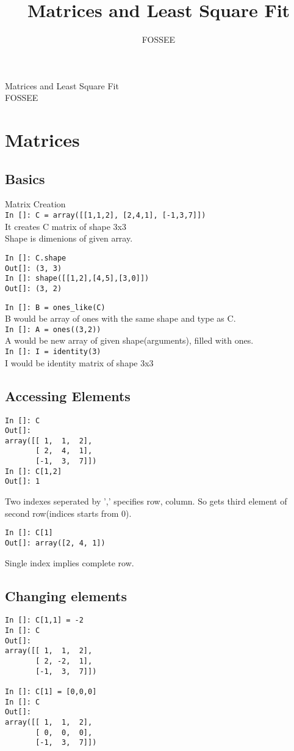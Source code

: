 \documentclass[12pt]{article}
\title{Matrices and Least Square Fit}
\author{FOSSEE}
\newcommand{\typ}[1]{\lstinline{#1}}
\begin{document}
\date{}
\vspace{-1in}
\begin{center}
\LARGE{Matrices and Least Square Fit}\\
\large{FOSSEE}
\end{center}
\section{Matrices}
\subsection{Basics}
Matrix Creation\\
\typ{In []: C = array([[1,1,2], [2,4,1], [-1,3,7]])}\\
It creates C matrix of shape 3x3\\
Shape is dimenions of given array.
\begin{lstlisting}
In []: C.shape 
Out[]: (3, 3)
In []: shape([[1,2],[4,5],[3,0]])
Out[]: (3, 2)
\end{lstlisting}
\typ{In []: B = ones_like(C)} \\
B would be array of ones with the same shape and type as C.\\
\typ{In []: A = ones((3,2))} \\
A would be new array of given shape(arguments), filled with ones.\\ 
\typ{In []: I = identity(3)}\\
I would be identity matrix of shape 3x3

\subsection{Accessing Elements}
\begin{lstlisting}
In []: C
Out[]: 
array([[ 1,  1,  2],
       [ 2,  4,  1],
       [-1,  3,  7]])
In []: C[1,2]
Out[]: 1
\end{lstlisting}
Two indexes seperated by ',' specifies row, column. So  gets third element of second row(indices starts from 0).
\newpage
\begin{lstlisting}
In []: C[1]
Out[]: array([2, 4, 1])
\end{lstlisting}
Single index implies complete row.
\subsection{Changing elements}
\begin{lstlisting}
In []: C[1,1] = -2
In []: C
Out[]: 
array([[ 1,  1,  2],
       [ 2, -2,  1],
       [-1,  3,  7]])

In []: C[1] = [0,0,0]
In []: C
Out[]: 
array([[ 1,  1,  2],
       [ 0,  0,  0],
       [-1,  3,  7]])
\end{lstlisting}
\end{document}
